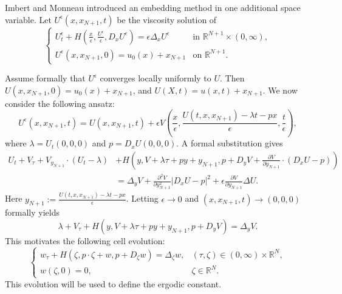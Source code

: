 \documentclass[preprint]{elsarticle}
\numberwithin{equation}{section}
\begin{document}
Imbert and Monneau introduced an embedding method in one additional space variable. Let $U^\epsilon(x,x_{N+1},t)$ be the viscosity solution of
\begin{equation}
\begin{cases}
U^\epsilon_t + H\left(\frac{x}{\epsilon}, \frac{U^\epsilon}{\epsilon}, D_x U^\epsilon\right) = \epsilon \Delta_x U^\epsilon & \text{in } \mathbb{R}^{N+1} \times (0,\infty), \\
U^\epsilon(x, x_{N+1}, 0) = u_0(x) + x_{N+1} & \text{on } \mathbb{R}^{N+1}.
\end{cases}
\label{eq:5.1}
\end{equation}

\vspace{1cm}

Assume formally that $U^\epsilon$ converges locally uniformly to $U$. Then $U(x, x_{N+1}, 0) = u_0(x) + x_{N+1}$, and $U(X,t) = u(x,t) + x_{N+1}$. We now consider the following ansatz:
\begin{equation*}
U^\epsilon(x, x_{N+1}, t) = U(x, x_{N+1}, t) + \epsilon V\left(\frac{x}{\epsilon}, \frac{U(t, x, x_{N+1}) - \lambda t - px}{\epsilon}, \frac{t}{\epsilon}\right),
\label{eq:5.2}
\end{equation*}
where $\lambda = U_t(0,0,0)$ and $p = D_x U(0,0,0)$. A formal substitution gives
\begin{align*}
 U_t + V_\tau + V_{y_{N+1}} \cdot (U_t - \lambda) &+ H\left(y, V + \lambda \tau + py + y_{N+1}, p + D_y V+ \frac{\partial V}{\partial y_{N+1}}\cdot (D_x U - p)\right) \\
& = \Delta_y V + \frac{\partial^2 V}{\partial y_{N+1}^2} |D_x U - p|^2 + \epsilon \frac{\partial V}{\partial y_{N+1}} \Delta U.
\end{align*}
\bigskip
Here $y_{N+1} := \frac{U(t, x, x_{N+1}) - \lambda t - px}{\epsilon}$. Letting $\epsilon\to0$ and $(x,x_{N+1},t)\to(0,0,0)$ formally yields
\begin{equation*}
\lambda + V_\tau + H(y, V + \lambda \tau + py + y_{N+1}, p + D_y V) = \Delta_y V.
\label{eq:5.3}
\end{equation*}
This motivates the following cell evolution:
\begin{equation*}
\begin{cases}
w_\tau+H(\zeta,p\cdot\zeta+w,p+D_\zeta w)=\Delta_\zeta w,
&(\tau,\zeta)\in(0,\infty)\times\mathbb R^N,\\
w(\zeta,0)=0,
&\zeta\in\mathbb R^N.
\end{cases}
\end{equation*}
This evolution will be used to define the ergodic constant.
\end{document}
